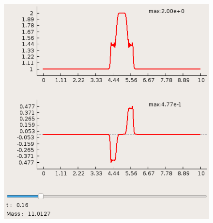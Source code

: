 \documentclass[a4paper, 11pt]{article}
\begin{document}
\begin{figure}[H]
\begin{minipage}[H] {0.49\linewidth}
		\includegraphics[width=1\linewidth]{p1/p1_t=0,16.png}
	\end{minipage}
\end{figure}
\newpage
\end{document}
